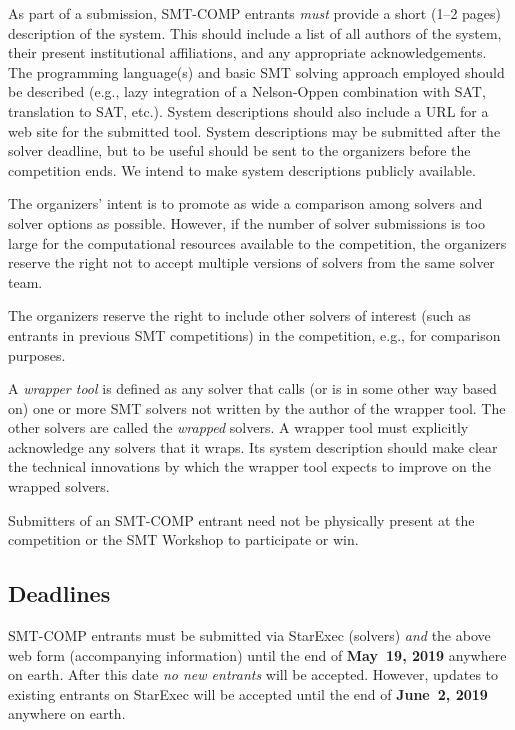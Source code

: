 \documentclass[12pt]{article}
\begin{document}
%
As part of a submission, SMT-COMP entrants \emph{must} provide a short (1--2
pages) description of the system.
This should include a list of all authors of the system, their present
institutional affiliations, and any appropriate acknowledgements.  The
programming language(s) and basic SMT solving approach employed should
be described (e.g., lazy integration of a Nelson-Oppen combination
with SAT, translation to SAT, etc.).  System descriptions should also
include a URL for a web site for the submitted tool.  System
descriptions may be submitted after the solver deadline, but to be
useful should be sent to the organizers before the competition ends.
We intend to make system descriptions publicly available.

%
The organizers' intent is to promote as wide a comparison among
solvers and solver options as possible.  However, if the number of
solver submissions is too large for the computational resources
available to the competition, the organizers reserve the right not to
accept multiple versions of solvers from the same solver team.

%
The organizers reserve the right to include other solvers of interest
(such as entrants in previous SMT competitions) in the competition,
e.g., for comparison purposes.

%
A \emph{wrapper tool} is defined as any solver that calls (or is in
some other way based on) one or more SMT solvers not written by the
author of the wrapper tool.  The other solvers are called the
\emph{wrapped} solvers.  A wrapper tool must explicitly acknowledge
any solvers that it wraps.  Its system description should make clear
the technical innovations by which the wrapper tool expects to improve
on the wrapped solvers.

%
Submitters of an SMT-COMP entrant need not be physically present at
the competition or the SMT Workshop to participate or win.


\subsection*{Deadlines}

SMT-COMP entrants must be submitted via StarExec (solvers) \emph{and}
the above web form (accompanying information) until the end of
{\bf May~19, 2019} anywhere on earth.
After this date \emph{no new entrants} will be accepted.
However, updates to existing entrants on StarExec
will be accepted until the end of {\bf June~2, 2019} anywhere on earth.
\end{document}
